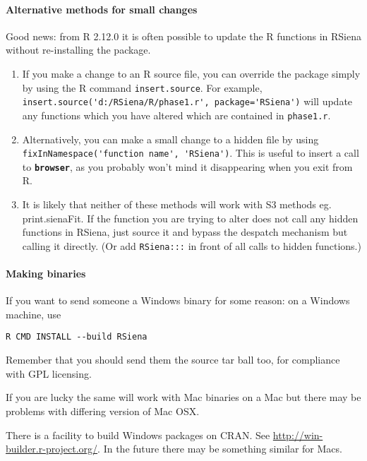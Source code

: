 \documentclass[12pt, a4paper]{article}
\renewcommand{\=}{\,=\,}
\newcommand{\+}{\,+\,}
\newcommand{\sfn}[1]{\textbf{\texttt{#1}}}
\begin{document}
\paragraph{Alternative methods for small changes}
Good news: from R 2.12.0 it is often possible to update the R functions in
RSiena without re-installing the
package.
\begin{enumerate}
\item If you make a change to an R source file, you can override the package
  simply by using the R command \verb|insert.source|. For example,
  \verb|insert.source('d:/RSiena/R/phase1.r', package='RSiena')| will update any
  functions which you have altered which are contained in \verb|phase1.r|.
\item Alternatively, you can make a small change to a hidden file by using
  \verb|fixInNamespace('function name', 'RSiena')|.  This is useful to insert a
  call to \sfn{browser}, as you probably won't mind it disappearing when you
  exit from R.
\item It is likely that neither of these methods will work with S3 methods
  eg. print.sienaFit. If the function you are trying to alter does not call any
  hidden functions in RSiena, just source it and bypass the despatch mechanism
  but calling it directly. (Or add \verb|RSiena:::| in front of all calls to
  hidden functions.)
\end{enumerate}
\paragraph{Making  binaries}
If you want to send someone a Windows binary for some reason: on a Windows
machine, use

\verb|R CMD INSTALL --build RSiena|

Remember that you should send them the source tar ball too, for compliance with
GPL licensing.

If you are lucky the same will work with Mac binaries on a Mac but there may be
problems with differing version of Mac OSX.

There is a facility to build Windows packages on CRAN. See
\url{http://win-builder.r-project.org/}. In the future there may be something
similar for Macs.
\end{document}
